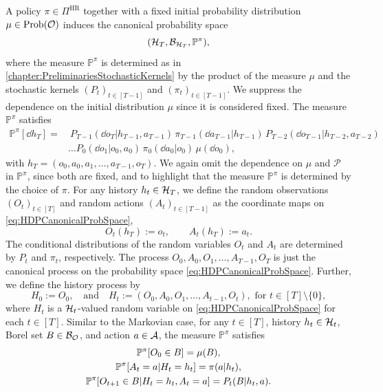 \documentclass[
    a4paper,
    11pt,
    bibliography=totoc,
    listof=totoc,      
    headinclude=true,
    cleardoublepage=empty,
]{scrbook}
\theoremstyle{plain}
\theoremstyle{definition}
\theoremstyle{remark}
\newcommand{\PM}{\mathbb P}
\newcommand{\SpaceA}{{\cal A}}
\newcommand{\SpaceO}{{\cal O}}
\newcommand{\SpaceH}{{\cal H}}
\begin{document}
A policy $\pi\in\Pi^\text{HR}$ together with a fixed initial probability 
distribution $\mu\in\text{Prob}(\SpaceO)$ induces the canonical probability 
space
\begin{equation}
\label{eq:HDPCanonicalProbSpace}
    (\SpaceH_T, \mathcal{B}_{\SpaceH_T}, \PM^\pi),
\end{equation}
where the measure $\PM^\pi$ is determined as in 
\cref{chapter:PreliminariesStochasticKernels} by the product of the measure 
$\mu$ and the stochastic kernels $(P_t)_{t\in[T-1]}$ and 
$(\pi_t)_{t\in[T-1]}$. We suppress the dependence on the initial distribution 
$\mu$ since it is considered fixed. The measure $\PM^\pi$ satisfies
\begin{equation}
\label{eq:HDPCanonicalMeasure}
\begin{split}
    \PM^\pi [\dd{h_T}] 
    = &\ P_{T-1}(\dd o_T | h_{T-1}, a_{T-1})\, \pi_{T-1}(\dd a_{T-1}|h_{T-1})\,
    P_{T-2}(\dd o_{T-1} | h_{T-2}, a_{T-2}) \\
    &\dots P_{0}(\dd o_1 | o_0, a_0)\, \pi_0(\dd a_0|o_0)\, \mu(\dd o_0),
\end{split}    
\end{equation}
with $h_T = (o_0, a_0, a_1, \dots, a_{T-1}, o_T)$. We again omit the 
dependence on $\mu$ and $\mathcal{P}$ in $\PM^\pi$, since both are fixed, and 
to highlight that the measure $\PM^\pi$ is determined by the choice of $\pi$.
For any history
$h_t\in\SpaceH_T$, we define the random observations $(O_t)_{t\in[T]}$ and 
random actions $(A_t)_{t\in[T-1]}$ as the coordinate maps on
\eqref{eq:HDPCanonicalProbSpace},
\[
    O_t(h_T) := o_t, \qquad A_t(h_T) := a_t.
\]
The conditional distributions of the random variables $O_t$ and $A_t$ are 
determined by $P_t$ and $\pi_t$, respectively. The process $O_0, A_0, O_1, 
\dots, A_{T-1}, O_T$ is just the canonical process on the probability space
\eqref{eq:HDPCanonicalProbSpace}. Further, we define the history process by
\[
    H_0 := O_0,
    \quad \text{and} \quad
    H_t := (O_0, A_0, O_1, \dots, A_{t-1}, O_t), \text{ for } t\in[T]\setminus\{0\},
\]
where $H_t$ is a $\SpaceH_t$-valued random variable on 
\eqref{eq:HDPCanonicalProbSpace} for each $t\in[T]$. Similar to the Markovian 
case, for any $t\in[T]$, history $h_t\in\SpaceH_t$, Borel set $B\in\mathcal{B}_\SpaceO$, and action $a\in\SpaceA$, the measure $\PM^\pi$ satisfies
\begin{gather}
    \PM^\pi[O_0\in B] = \mu(B), \notag\\
    \label{eq:HDPActionProb}    
    \PM^\pi[A_t = a|H_t = h_t] = \pi(a|h_t), \\
    \PM^\pi[O_{t+1}\in B|H_t=h_t, A_t=a] = P_t(B|h_t,a) \notag.
\end{gather}
\end{document}
